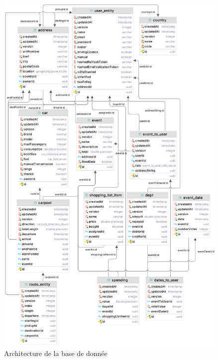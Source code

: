 \begin{figure}[h!]
    \includegraphics[width=\linewidth]{./images/dbShema}\caption{Architecture de la base de donnée}\label{fig:dbSchema2}
    \centering
\end{figure}